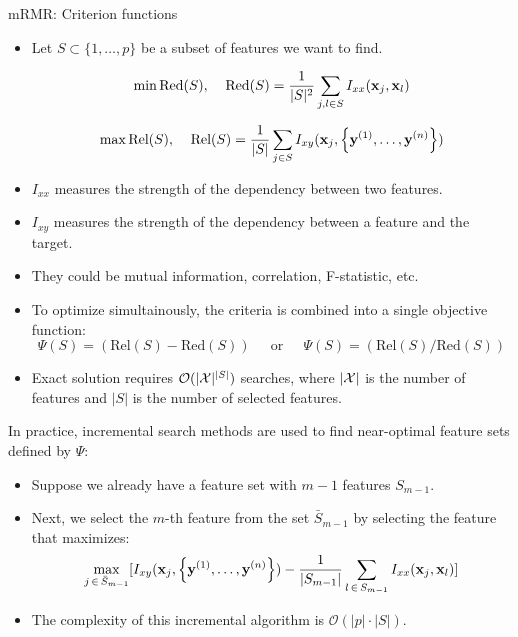 \documentclass[11pt,compress,t,notes=noshow, xcolor=table]{beamer}
\begin{document}
  \begin{vbframe}{\MakeLowercase{M}RMR: Criterion functions}
  \begin{itemize}
  \item Let $S \subset \{1, \dots, p \}$ be a subset of features we want to find.

  $$\min \text{Red}(S), \;\;\;\; \text{Red}(S) = \frac{1}{|S|^2} \sum_{j, l \in S} I_{xx}(\mathbf{x}_j, \mathbf{x}_l)$$

  $$\max \text{Rel}(S), \;\;\;\; \text{Rel}(S) = \frac{1}{|S|} \sum_{j \in S} I_{xy}(\mathbf{x}_j, \left\{ \mathbf{y}^{(1)}, \ldots, \mathbf{y}^{(n)}\right\})$$

  \item $I_{xx}$ measures the strength of the dependency between two features.
  \item $I_{xy}$ measures the strength of the dependency between a feature and the target.
  \item They could be mutual information, correlation, F-statistic, etc.
  \end{itemize}


  \framebreak

  \begin{itemize}
  \item To optimize simultainously, the criteria is combined into a single objective function:
  $$\Psi(S) = (\text{Rel}(S) - \text{Red}(S)) \;\;\;\; \text{ or } \;\;\;\; \Psi(S) = (\text{Rel}(S)/\text{Red}(S))$$

  \item Exact solution requires $ \mathcal{O} (|\mathcal{X}|^{|S|})$ searches, where $|\mathcal{X}|$ is the number of features and $|S|$ is the number of selected features.
  \end{itemize}
  In practice, incremental search methods are used to find near-optimal feature sets defined by $\Psi$:
  \begin{itemize}
  \item Suppose we already have a feature set with $m-1$ features $S_{m-1}$.
  \item Next, we select the $m$-th feature from the set $\bar{S}_{m-1}$ by selecting the feature that maximizes:
  $$\max_{j \, \in \, \bar{S}_{m-1}} [ I_{xy} (\mathbf{x}_j, \left\{ \mathbf{y}^{(1)}, \ldots, \mathbf{y}^{(n)}\right\}) - \frac{1}{|S_{m-1}|} \sum_{l \, \in \, S_{m-1}} I_{xx}(\mathbf{x}_j, \mathbf{x}_l)  ]$$
  \item The complexity of this incremental algorithm is $\mathcal{O}(|p| \cdot| S|)$.
  \end{itemize}
  \end{vbframe}
\end{document}
